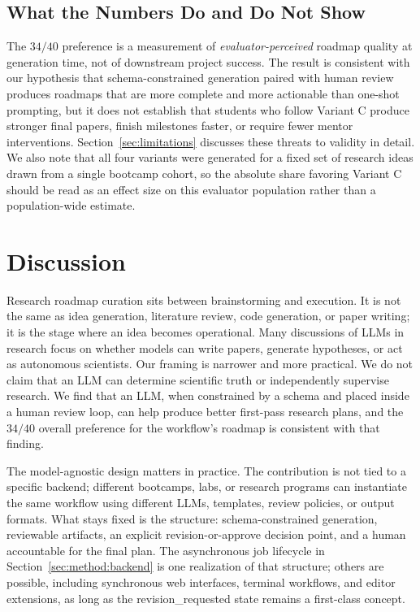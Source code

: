 \documentclass{article}
\begin{document}
\subsection*{What the Numbers Do and Do Not Show}
The $34/40$ preference is a measurement of \emph{evaluator-perceived}
roadmap quality at generation time, not of downstream project success.
The result is consistent with our hypothesis that schema-constrained
generation paired with human review produces roadmaps that are more
complete and more actionable than one-shot prompting, but it does not
establish that students who follow Variant C produce stronger final
papers, finish milestones faster, or require fewer mentor interventions.
Section~\ref{sec:limitations} discusses these threats to validity in
detail. We also note that all four variants were generated for a fixed
set of research ideas drawn from a single bootcamp cohort, so the
absolute share favoring Variant C should be read as an effect size on
this evaluator population rather than a population-wide estimate.

\section{Discussion}
\label{sec:discussion}

Research roadmap curation sits between brainstorming and execution. It
is not the same as idea generation, literature review, code generation,
or paper writing; it is the stage where an idea becomes operational.
Many discussions of LLMs in research focus on whether models can write
papers, generate hypotheses, or act as autonomous scientists. Our
framing is narrower and more practical. We do not claim that an LLM can
determine scientific truth or independently supervise research. We find
that an LLM, when constrained by a schema and placed inside a human
review loop, can help produce better first-pass research plans, and the
$34/40$ overall preference for the workflow's roadmap is consistent
with that finding.

The model-agnostic design matters in practice. The contribution is not
tied to a specific backend; different bootcamps, labs, or research
programs can instantiate the same workflow using different LLMs,
templates, review policies, or output formats. What stays fixed is the
structure: schema-constrained generation, reviewable artifacts, an
explicit revision-or-approve decision point, and a human accountable
for the final plan. The asynchronous job lifecycle in
Section~\ref{sec:method:backend} is one realization of that structure;
others are possible, including synchronous web interfaces, terminal
workflows, and editor extensions, as long as the
\textsf{revision\_requested} state remains a first-class concept.
\end{document}
